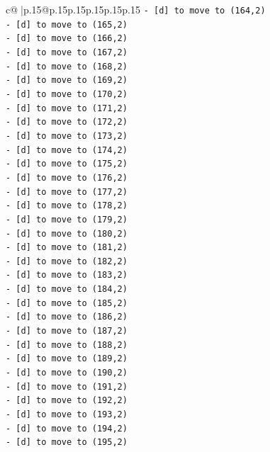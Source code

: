 \documentclass{article}
\begin{document}
{\begin{supertabular}{c@{$\;$}|p{.15\linewidth}@{}p{.15\linewidth}p{.15\linewidth}p{.15\linewidth}p{.15\linewidth}p{.15\linewidth}}
{{{\texttt{{-} {[}d{]} to move to (164,2)} \\
\texttt{{-} {[}d{]} to move to (165,2)} \\
\texttt{{-} {[}d{]} to move to (166,2)} \\
\texttt{{-} {[}d{]} to move to (167,2)} \\
\texttt{{-} {[}d{]} to move to (168,2)} \\
\texttt{{-} {[}d{]} to move to (169,2)} \\
\texttt{{-} {[}d{]} to move to (170,2)} \\
\texttt{{-} {[}d{]} to move to (171,2)} \\
\texttt{{-} {[}d{]} to move to (172,2)} \\
\texttt{{-} {[}d{]} to move to (173,2)} \\
\texttt{{-} {[}d{]} to move to (174,2)} \\
\texttt{{-} {[}d{]} to move to (175,2)} \\
\texttt{{-} {[}d{]} to move to (176,2)} \\
\texttt{{-} {[}d{]} to move to (177,2)} \\
\texttt{{-} {[}d{]} to move to (178,2)} \\
\texttt{{-} {[}d{]} to move to (179,2)} \\
\texttt{{-} {[}d{]} to move to (180,2)} \\
\texttt{{-} {[}d{]} to move to (181,2)} \\
\texttt{{-} {[}d{]} to move to (182,2)} \\
\texttt{{-} {[}d{]} to move to (183,2)} \\
\texttt{{-} {[}d{]} to move to (184,2)} \\
\texttt{{-} {[}d{]} to move to (185,2)} \\
\texttt{{-} {[}d{]} to move to (186,2)} \\
\texttt{{-} {[}d{]} to move to (187,2)} \\
\texttt{{-} {[}d{]} to move to (188,2)} \\
\texttt{{-} {[}d{]} to move to (189,2)} \\
\texttt{{-} {[}d{]} to move to (190,2)} \\
\texttt{{-} {[}d{]} to move to (191,2)} \\
\texttt{{-} {[}d{]} to move to (192,2)} \\
\texttt{{-} {[}d{]} to move to (193,2)} \\
\texttt{{-} {[}d{]} to move to (194,2)} \\
\texttt{{-} {[}d{]} to move to (195,2)} \\
}}}
\end{supertabular}}
\end{document}
